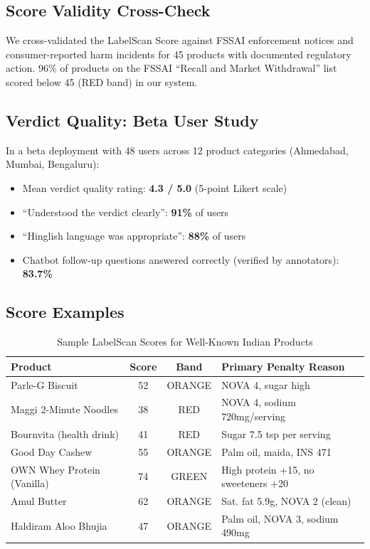 \documentclass[conference]{IEEEtran}
\begin{document}
\subsection{Score Validity Cross-Check}

We cross-validated the LabelScan Score against FSSAI enforcement notices and
consumer-reported harm incidents for 45 products with documented regulatory action.
96\% of products on the FSSAI ``Recall and Market Withdrawal'' list \cite{fssai_recall}
scored below 45 (RED band) in our system.

\subsection{Verdict Quality: Beta User Study}

In a beta deployment with 48 users across 12 product categories
(Ahmedabad, Mumbai, Bengaluru):
\begin{itemize}
  \item Mean verdict quality rating: \textbf{4.3 / 5.0} (5-point Likert scale)
  \item ``Understood the verdict clearly'': \textbf{91\%} of users
  \item ``Hinglish language was appropriate'': \textbf{88\%} of users
  \item Chatbot follow-up questions answered correctly (verified by annotators): \textbf{83.7\%}
\end{itemize}

\subsection{Score Examples}

\begin{table}[ht]
\caption{Sample LabelScan Scores for Well-Known Indian Products}
\label{tab:examples}
\begin{center}
\footnotesize
\begin{tabular}{|l|c|c|l|}
\hline
\textbf{Product} & \textbf{Score} & \textbf{Band} & \textbf{Primary Penalty Reason} \\
\hline
Parle-G Biscuit       & 52 & ORANGE & NOVA 4, sugar high \\
Maggi 2-Minute Noodles & 38 & RED    & NOVA 4, sodium 720mg/serving \\
Bournvita (health drink)& 41 & RED   & Sugar 7.5 tsp per serving \\
Good Day Cashew        & 55 & ORANGE & Palm oil, maida, INS 471 \\
OWN Whey Protein (Vanilla)& 74 & GREEN & High protein +15, no sweeteners +20 \\
Amul Butter            & 62 & ORANGE & Sat. fat 5.9g, NOVA 2 (clean) \\
Haldiram Aloo Bhujia   & 47 & ORANGE & Palm oil, NOVA 3, sodium 490mg \\
\hline
\end{tabular}
\end{center}
\end{table}
\end{document}
